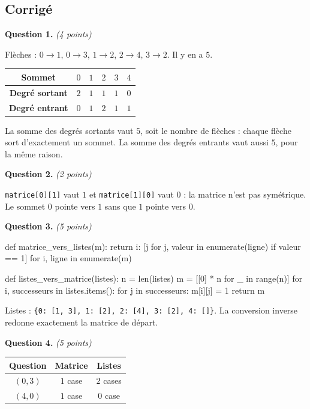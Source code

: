 \subsection*{Corrigé}

\textbf{Question 1.} \emph{(4 points)}

Flèches : $0 \rightarrow 1$, $0 \rightarrow 3$, $1 \rightarrow 2$,
$2 \rightarrow 4$, $3 \rightarrow 2$. Il y en a $5$.

\begin{center}
\begin{tabular}{|c|c|c|c|c|c|}
\hline
\textbf{Sommet} & $0$ & $1$ & $2$ & $3$ & $4$ \\
\hline
\textbf{Degré sortant} & $2$ & $1$ & $1$ & $1$ & $0$ \\
\hline
\textbf{Degré entrant} & $0$ & $1$ & $2$ & $1$ & $1$ \\
\hline
\end{tabular}
\end{center}

La somme des degrés sortants vaut $5$, soit le nombre de flèches : chaque
flèche sort d'exactement un sommet. La somme des degrés entrants vaut aussi
$5$, pour la même raison.

\medskip
\textbf{Question 2.} \emph{(2 points)}

\lstinline{matrice[0][1]} vaut $1$ et \lstinline{matrice[1][0]} vaut $0$ : la
matrice n'est pas symétrique. Le sommet $0$ pointe vers $1$ sans que $1$ pointe
vers $0$.

\medskip
\textbf{Question 3.} \emph{(5 points)}

\begin{python}
def matrice_vers_listes(m):
    return {i: [j for j, valeur in enumerate(ligne) if valeur == 1]
            for i, ligne in enumerate(m)}

def listes_vers_matrice(listes):
    n = len(listes)
    m = [[0] * n for _ in range(n)]
    for i, successeurs in listes.items():
        for j in successeurs:
            m[i][j] = 1
    return m
\end{python}

Listes : \lstinline!{0: [1, 3], 1: [2], 2: [4], 3: [2], 4: []}!. La conversion
inverse redonne exactement la matrice de départ.

\medskip
\textbf{Question 4.} \emph{(5 points)}

\begin{center}
\begin{tabular}{|c|c|c|}
\hline
\textbf{Question} & \textbf{Matrice} & \textbf{Listes} \\
\hline
$(0, 3)$ & $1$ case & $2$ cases \\
\hline
$(4, 0)$ & $1$ case & $0$ case \\
\hline
\end{tabular}
\end{center}

